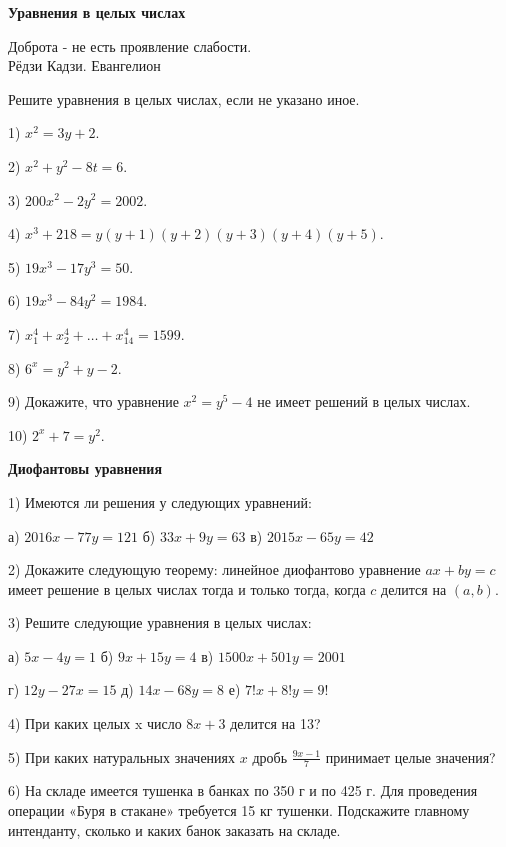 \centerline{\bf \Huge Уравнения в целых числах}


\begin{flushright}
        \scriptsize{Доброта - не есть проявление слабости.\\ Рёдзи Кадзи. Евангелион}
\end{flushright}


\large 
Решите уравнения в целых числах, если не указано иное.


1) $x^2 = 3 y + 2$.

2) $x^2 + y^2 - 8 t = 6$.

3) $200 x^2 - 2 y^2 = 2002$.

4) $x^3 + 218 = y (y + 1) (y + 2) (y + 3) (y + 4) (y + 5)$.

5) $19 x^3 - 17 y^3 = 50$.

6) $19 x^3 - 84 y^2 = 1984$.

7) $x_{1}^4 + x_{2}^4 + \ldots + x_{14}^4 = 1599$.

8) $6^x = y^2 + y - 2$.

9) Докажите, что уравнение $x^2 = y^5 - 4$ не имеет решений в целых числах.

10) $2^x + 7 = y^2$.


\centerline{\bf \Huge Диофантовы уравнения}

\Large

1) Имеются ли решения у следующих уравнений:

а) $2016x-77y=121$ \hspace{2 cm} б) $33x+9y=63$ \hspace{2cm} в) $2015x-65y=42$


2) Докажите следующую теорему: линейное диофантово уравнение $ax+by=c$ имеет решение в целых числах тогда и только тогда, когда $c$ делится на $(a,b)$.

3) Решите следующие уравнения в целых числах:

а) $5x-4y=1$ \hspace{2 cm} б) $9x+15y=4$ \hspace{2cm} в) $1500x+501y=2001$

г) $12y-27x=15$ \hspace{1,4cm} д) $14x-68y=8$ \hspace{1,8 cm} е) $7!x+8!y=9!$ 

4) При каких целых x число $8x + 3$ делится на 13?

5) При каких натуральных значениях $x$ дробь $\frac{9x-1}{7}$ принимает целые значения?

6) На складе имеется тушенка в банках по 350 г и по 425 г. Для проведения операции «Буря в стакане» требуется 15 кг тушенки. Подскажите главному  интенданту, сколько и каких банок заказать на складе.

